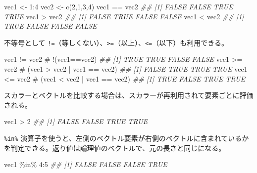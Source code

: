 \documentclass[
  letterpaper,
  xelatex,
  ja=standard, xelatex]{bxjsbook}
\newenvironment{Shaded}{\begin{snugshade}}{\end{snugshade}}
\newcommand{\CommentTok}[1]{\textcolor[rgb]{0.37,0.37,0.37}{#1}}
\newcommand{\DecValTok}[1]{\textcolor[rgb]{0.68,0.00,0.00}{#1}}
\newcommand{\DocumentationTok}[1]{\textcolor[rgb]{0.37,0.37,0.37}{\textit{#1}}}
\newcommand{\FunctionTok}[1]{\textcolor[rgb]{0.28,0.35,0.67}{#1}}
\newcommand{\NormalTok}[1]{\textcolor[rgb]{0.00,0.23,0.31}{#1}}
\newcommand{\OtherTok}[1]{\textcolor[rgb]{0.00,0.23,0.31}{#1}}
\newcommand{\SpecialCharTok}[1]{\textcolor[rgb]{0.37,0.37,0.37}{#1}}
\begin{document}
\begin{Shaded}
\begin{Highlighting}[]
\NormalTok{vec1 }\OtherTok{\textless{}{-}} \DecValTok{1}\SpecialCharTok{:}\DecValTok{4}
\NormalTok{vec2 }\OtherTok{\textless{}{-}} \FunctionTok{c}\NormalTok{(}\DecValTok{2}\NormalTok{,}\DecValTok{1}\NormalTok{,}\DecValTok{3}\NormalTok{,}\DecValTok{4}\NormalTok{)}
\NormalTok{vec1 }\SpecialCharTok{==}\NormalTok{ vec2}
\DocumentationTok{\#\# [1] FALSE FALSE  TRUE  TRUE}
\NormalTok{vec1 }\SpecialCharTok{\textgreater{}}\NormalTok{ vec2}
\DocumentationTok{\#\# [1] FALSE  TRUE FALSE FALSE}
\NormalTok{vec1 }\SpecialCharTok{\textless{}}\NormalTok{ vec2}
\DocumentationTok{\#\# [1]  TRUE FALSE FALSE FALSE}
\end{Highlighting}
\end{Shaded}

不等号として
\texttt{!=}（等しくない）、\texttt{\textgreater{}=}（以上）、\texttt{\textless{}=}（以下）も利用できる。

\begin{Shaded}
\begin{Highlighting}[]
\NormalTok{vec1 }\SpecialCharTok{!=}\NormalTok{ vec2 }\CommentTok{\# !(vec1==vec2)}
\DocumentationTok{\#\# [1]  TRUE  TRUE FALSE FALSE}
\NormalTok{vec1 }\SpecialCharTok{\textgreater{}=}\NormalTok{ vec2 }\CommentTok{\# (vec1 \textgreater{} vec2 | vec1 == vec2)}
\DocumentationTok{\#\# [1] FALSE  TRUE  TRUE  TRUE}
\NormalTok{vec1 }\SpecialCharTok{\textless{}=}\NormalTok{ vec2 }\CommentTok{\# (vec1 \textless{} vec2 | vec1 == vec2)}
\DocumentationTok{\#\# [1]  TRUE FALSE  TRUE  TRUE}
\end{Highlighting}
\end{Shaded}

スカラーとベクトルを比較する場合は、スカラーが再利用されて要素ごとに評価される。

\begin{Shaded}
\begin{Highlighting}[]
\NormalTok{vec1 }\SpecialCharTok{\textgreater{}} \DecValTok{2}
\DocumentationTok{\#\# [1] FALSE FALSE  TRUE  TRUE}
\end{Highlighting}
\end{Shaded}

\texttt{\%in\%}
演算子を使うと、左側のベクトル要素が右側のベクトルに含まれているかを判定できる。返り値は論理値のベクトルで、元の長さと同じになる。

\begin{Shaded}
\begin{Highlighting}[]
\NormalTok{vec1 }\SpecialCharTok{\%in\%} \DecValTok{4}\SpecialCharTok{:}\DecValTok{5}
\DocumentationTok{\#\# [1] FALSE FALSE FALSE  TRUE}
\end{Highlighting}
\end{Shaded}
\end{document}
